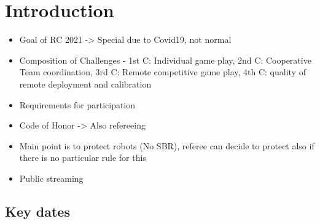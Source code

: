 \section{Introduction}

\begin{itemize}
    \item Goal of RC 2021 -> Special due to Covid19, not normal
    \item Composition of Challenges - 1st C: Individual game play, 2nd C: Cooperative Team coordination, 3rd C: Remote competitive game play, 4th C: quality of remote deployment and calibration 
    \item Requirements for participation
    \item Code of Honor -> Also refereeing
    \item Main point is to protect robots (No SBR), referee can decide to protect also if there is no particular rule for this
    \item Public streaming
\end{itemize}

\subsection{Key dates}